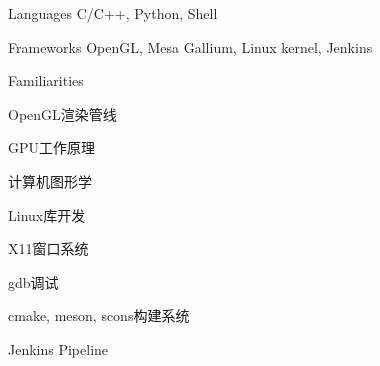 
\begin{cvskills}
  \cvskill
    {Languages} %
    {C/C++, Python, Shell} %

  \cvskill
    {Frameworks} %
    {OpenGL, Mesa Gallium, Linux kernel, Jenkins} %
\end{cvskills}

\begin{cventries}
  \cventry
    {} %
    {Familiarities} %
    {\hspace{1cm}} %
    {} %
    {
      \begin{cvitems} %
        \item {OpenGL渲染管线}
        \item {GPU工作原理}
        \item {计算机图形学}
        \item {Linux库开发}
        \item {X11窗口系统}
        \item {gdb调试}
        \item {cmake, meson, scons构建系统}
        \item {Jenkins Pipeline}
      \end{cvitems}
    }
\end{cventries}
